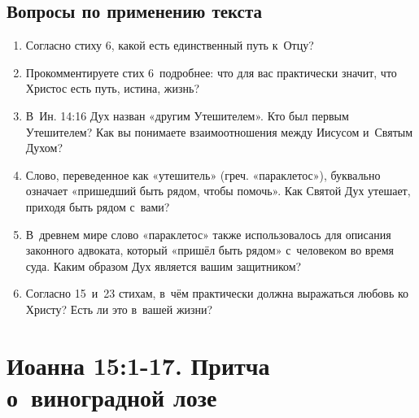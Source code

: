 \documentclass[a4paper,12pt]{article}
\begin{document}
\subsection*{Вопросы по применению текста} 
\begin{enumerate}
    \item Согласно стиху 6, какой есть единственный путь к~Отцу? 
    
    \myline
    
    \myline
    \item Прокомментируете стих 6~подробнее: что для вас практически значит, что Христос есть путь, истина, жизнь? 
    
    \myline
    
    \myline
    \item В~Ин. 14:16 Дух назван «другим Утешителем». Кто был первым Утешителем? Как вы понимаете взаимоотношения между Иисусом и~Святым Духом? 
    
    \myline
    
    \myline
    \item Слово, переведенное как «утешитель» (греч. «параклетос»), буквально означает «пришедший быть рядом, чтобы помочь». Как Святой Дух утешает, приходя быть рядом с~вами? 
    
    \myline
    
    \myline
    \item В~древнем мире слово «параклетос» также использовалось для описания законного адвоката, который «пришёл быть рядом» с~человеком во время суда. Каким образом Дух является вашим защитником? 
    
    \myline
    
    \myline
    \item Согласно 15~и~23 стихам, в~чём практически должна выражаться любовь ко Христу? Есть ли это в~вашей жизни?
    
    \myline
    
    \myline
\end{enumerate}



\section{Иоанна 15:1-17. Притча о~виноградной лозе}
\end{document}
